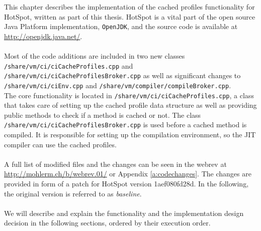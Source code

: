 This chapter describes the implementation of the cached profiles functionality for HotSpot, written as part of this thesis.
HotSpot is a vital part of the open source Java Platform implementation, \texttt{OpenJDK}, and the source code is available at \url{http://openjdk.java.net/}.
\\\\
Most of the code additions are included in two new classes \texttt{/share/vm/ci/ciCacheProfiles.cpp} and \texttt{/share/vm/ci/ciCacheProfilesBroker.cpp} as well as significant changes to \\\texttt{/share/vm/ci/ciEnv.cpp} and \texttt{/share/vm/compiler/compileBroker.cpp}.
\\
The core functionality is located in \texttt{/share/vm/ci/ciCacheProfiles.cpp}, a class that takes care of setting up the cached profile data structure as well as providing public methods to check if a method is cached or not. The class \texttt{/share/vm/ci/ciCacheProfilesBroker.cpp} is used before a cached method is compiled. It is responsible for setting up the compilation environment, so the JIT compiler can use the cached profiles.
\\\\
A full list of modified files and the changes can be seen in the webrev at \url{http://mohlerm.ch/b/webrev.01/} or Appendix \ref{a:codechanges}.
The changes are provided in form of a patch for HotSpot version 1aef080fd28d. In the following, the original version is referred to as \textit{baseline}.
\\\\
We will describe and explain the functionality and the implementation design decision in the following sections, ordered by their execution order.

